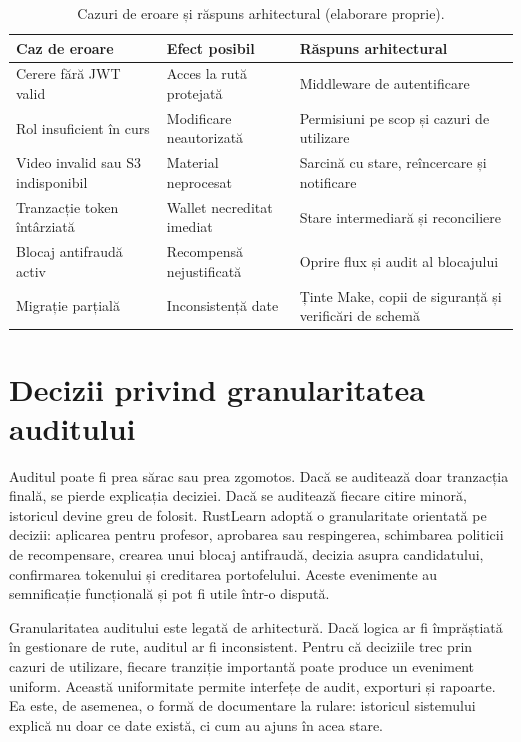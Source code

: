 \begin{table}[H]
    \centering
    \caption{Cazuri de eroare și răspuns arhitectural (elaborare proprie).}
    \label{tab:cazuri_eroare}
    \begin{tabular}{P{4cm}P{5cm}P{4.8cm}}
        \toprule
        Caz de eroare & Efect posibil & Răspuns arhitectural \\
        \midrule
        Cerere fără JWT valid & Acces la rută protejată & Middleware de autentificare \\
        Rol insuficient în curs & Modificare neautorizată & Permisiuni pe scop și cazuri de utilizare \\
        Video invalid sau S3 indisponibil & Material neprocesat & Sarcină cu stare, reîncercare și notificare \\
        Tranzacție token întârziată & Wallet necreditat imediat & Stare intermediară și reconciliere \\
        Blocaj antifraudă activ & Recompensă nejustificată & Oprire flux și audit al blocajului \\
        Migrație parțială & Inconsistență date & Ținte Make, copii de siguranță și verificări de schemă \\
        \bottomrule
    \end{tabular}
\end{table}

\section{Decizii privind granularitatea auditului}
Auditul poate fi prea sărac sau prea zgomotos. Dacă se auditează doar tranzacția finală, se pierde explicația deciziei. Dacă se auditează fiecare citire minoră, istoricul devine greu de folosit. RustLearn adoptă o granularitate orientată pe decizii: aplicarea pentru profesor, aprobarea sau respingerea, schimbarea politicii de recompensare, crearea unui blocaj antifraudă, decizia asupra candidatului, confirmarea tokenului și creditarea portofelului. Aceste evenimente au semnificație funcțională și pot fi utile într-o dispută.

Granularitatea auditului este legată de arhitectură. Dacă logica ar fi împrăștiată în gestionare de rute, auditul ar fi inconsistent. Pentru că deciziile trec prin cazuri de utilizare, fiecare tranziție importantă poate produce un eveniment uniform. Această uniformitate permite interfețe de audit, exporturi și rapoarte. Ea este, de asemenea, o formă de documentare la rulare: istoricul sistemului explică nu doar ce date există, ci cum au ajuns în acea stare.
